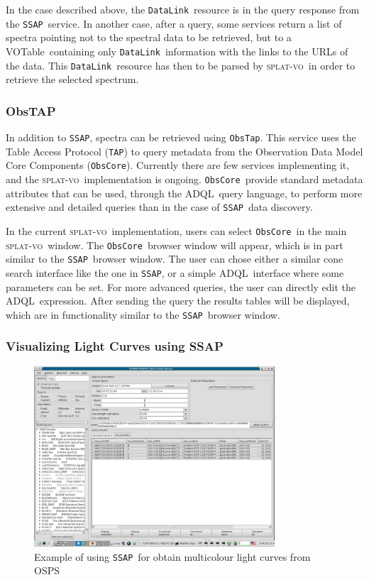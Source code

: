 \documentclass[final,authoryear,5p,times,twocolumn]{elsarticle}
\newcommand{\datalink}{\texttt{DataLink}}
\newcommand{\ssap}{\texttt{SSAP}}
\newcommand{\obstap}{\texttt{ObsTap}}
\newcommand{\tap}{\texttt{TAP}}
\newcommand{\obscore}{\texttt{ObsCore}}
\newcommand{\votable}{VOTable}
\newcommand{\adql}{ADQL}
\newcommand{\splatvo}{\textsc{splat-vo}}
\begin{document}
In the case described above, the \datalink\ resource is in the query
response from the \ssap\ service. In another case, after a query, some
services return a list of spectra pointing not to the spectral data to
be retrieved, but to a \votable\ containing only \datalink\ information
with the links to the URLs of the data. This \datalink\ resource has
then to be parsed by \splatvo\ in order to retrieve the selected spectrum.

\subsubsection{ObsTAP}

In addition to \ssap, spectra can be retrieved using \obstap. This service uses
the Table Access Protocol (\tap) to query metadata from the Observation
Data Model Core Components (\obscore). Currently there are few services
implementing it, and the \splatvo\ implementation is ongoing.  \obscore\
provide standard metadata attributes that can be used, through the
\adql\ query language, to perform more extensive and detailed queries
than in the case of \ssap\ data discovery.

In the current \splatvo\ implementation, users can select \obscore\ in the
main \splatvo\ window. The \obscore\ browser window will appear, which is in
part similar to the \ssap\ browser window. The user can chose either a
similar cone search interface like the one in \ssap, or a
simple \adql\ interface where some parameters can be set. For more
advanced queries, the user can directly edit the \adql\
expression. After sending the query the results tables will be
displayed, which are in functionality similar to the \ssap\ browser
window.

\subsubsection{Visualizing Light Curves using SSAP}

\begin{figure}[t]
\begin{center}
\includegraphics[width=0.8\textwidth]{OGLE-SC7-127550_query.pdf}
\caption{Example of using \ssap\ for obtain multicolour light curves from OSPS}
\label{fig:OGLE-SC7-127550_query}
\end{center}
\end{figure}
\end{document}
